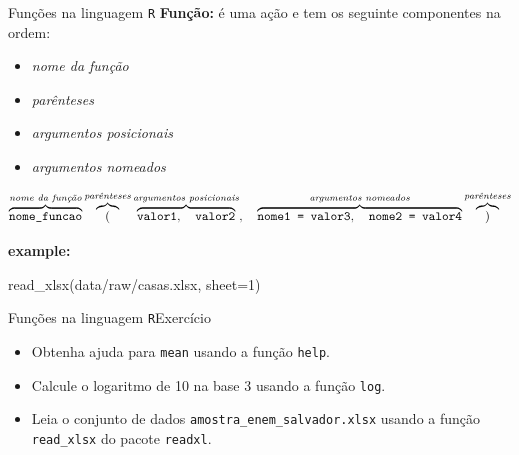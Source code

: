 \documentclass[
  10pt,
  ignorenonframetext,
]{beamer}
\newenvironment{Shaded}{}{}
\newcommand{\DataTypeTok}[1]{#1}
\newcommand{\DecValTok}[1]{#1}
\newcommand{\KeywordTok}[1]{\textcolor[rgb]{0.00,0.00,1.00}{#1}}
\newcommand{\NormalTok}[1]{#1}
\newcommand{\StringTok}[1]{\textcolor[rgb]{0.00,0.50,0.50}{#1}}
\providecommand{\tightlist}{%
  \setlength{\itemsep}{0pt}\setlength{\parskip}{0pt}}
\begin{document}
\begin{frame}[fragile]{Funções na linguagem \texttt{R}}
\protect\hypertarget{funuxe7uxf5es-na-linguagem-r}{}
\textbf{Função:} é uma ação e tem os seguinte componentes na ordem:

\begin{itemize}
\tightlist
\item
  \emph{nome da função}
\item
  \emph{parênteses}
\item
  \emph{argumentos posicionais}
\item
  \emph{argumentos nomeados}
\end{itemize}

\footnotesize

\[
\overbrace{\texttt{nome\_funcao}}^{\text{\textit{nome da função}}} \overbrace{(}^{\text{\textit{parênteses}}} \overbrace{\texttt{valor1},\quad \texttt{valor2}}^{\text{\textit{argumentos posicionais}}},\quad \overbrace{\texttt{nome1 = valor3},\quad \texttt{nome2 = valor4}}^{\text{\textit{argumentos nomeados}}} \overbrace{)}^{\text{\textit{parênteses}}}
\]

\normalsize

\textbf{example:}

\begin{Shaded}
\begin{Highlighting}[]
\KeywordTok{read\_xlsx}\NormalTok{(}\StringTok{\textquotesingle{}data/raw/casas.xlsx\textquotesingle{}}\NormalTok{, }\DataTypeTok{sheet=}\DecValTok{1}\NormalTok{)}
\end{Highlighting}
\end{Shaded}
\end{frame}

\begin{frame}[fragile]{Funções na linguagem
\texttt{R}\newline Exercício}
\protect\hypertarget{funuxe7uxf5es-na-linguagem-rexercuxedcio}{}
\begin{itemize}
\tightlist
\item
  Obtenha ajuda para \texttt{mean} usando a função \texttt{help}.
\item
  Calcule o logaritmo de 10 na base 3 usando a função \texttt{log}.
\item
  Leia o conjunto de dados \texttt{amostra\_enem\_salvador.xlsx} usando
  a função \texttt{read\_xlsx} do pacote \texttt{readxl}.
\end{itemize}
\end{frame}
\end{document}

